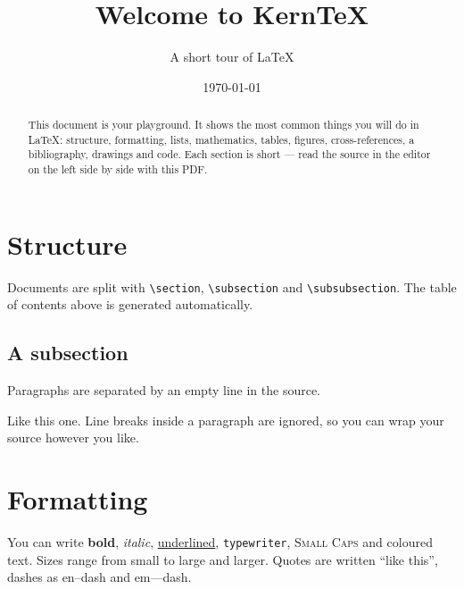 \documentclass[11pt,a4paper]{article}
\title{Welcome to \textsf{KernTeX}}
\author{A short tour of \LaTeX}
\date{\today}
\begin{document}
\maketitle

\begin{abstract}
  This document is your playground. It shows the most common things you will
  do in \LaTeX{}: structure, formatting, lists, mathematics, tables, figures,
  cross-references, a bibliography, drawings and code. Each section is short ---
  read the source in the editor on the left side by side with this PDF.
\end{abstract}

\tableofcontents

\section{Structure}
\label{sec:structure}
Documents are split with \verb|\section|, \verb|\subsection| and
\verb|\subsubsection|. The table of contents above is generated automatically.

\subsection{A subsection}
Paragraphs are separated by an empty line in the source.

Like this one. Line breaks inside a paragraph are ignored, so you can wrap
your source however you like.

\section{Formatting}
You can write \textbf{bold}, \textit{italic}, \underline{underlined},
\texttt{typewriter}, \textsc{Small Caps} and \textcolor{blue!70!black}{coloured}
text. Sizes range from {\small small} to {\large large} and {\Large larger}.
Quotes are written ``like this'', dashes as en--dash and em---dash.
\end{document}
